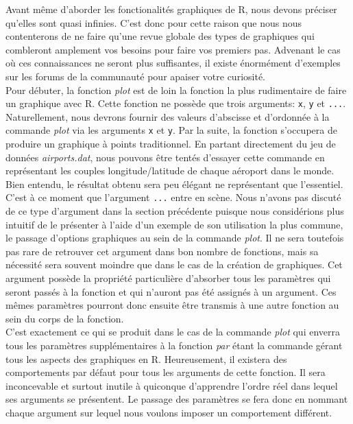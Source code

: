 Avant même d'aborder les fonctionalités graphiques de R, nous devons préciser qu'elles sont quasi infinies. C'est donc pour cette raison que nous nous contenterons de ne faire qu'une revue globale des types de graphiques qui combleront amplement vos besoins pour faire vos premiers pas. Advenant le cas où ces connaissances ne seront plus suffisantes, il existe énormément d'exemples sur les forums de la communauté pour apaiser votre curiosité. \\

\noindent
Pour débuter, la fonction \emph{plot} \cite{Rfunction:plot} est de loin la fonction la plus rudimentaire de faire un graphique avec R. Cette fonction ne possède que trois arguments: \texttt{x}, \texttt{y} et \texttt{...}. Naturellement, nous devrons fournir des valeurs d'abscisse et d'ordonnée à la commande \emph{plot} via les arguments \texttt{x} et \texttt{y}. Par la suite, la fonction s'occupera de produire un graphique à points traditionnel. En partant directement du jeu de données \emph{airports.dat}, nous pouvons être tentés d'essayer cette commande en représentant les couples longitude/latitude de chaque aéroport dans le monde. Bien entendu, le résultat obtenu sera peu élégant ne représentant que l'essentiel. \\

\noindent
C'est à ce moment que l'argument \texttt{...} entre en scène. Nous n'avons pas discuté de ce type d'argument dans la section précédente puisque nous considérions plus intuitif de le présenter à l'aide d'un exemple de son utilisation la plus commune, le passage d'options graphiques au sein de la commande \emph{plot}. Il ne sera toutefois pas rare de retrouver cet argument dans bon nombre de fonctions, mais sa nécessité sera souvent moindre que dans le cas de la création de graphiques. Cet argument possède la propriété particulière d'absorber tous les paramètres qui seront passés à la fonction et qui n'auront pas été assignés à un argument. Ces mêmes paramètres pourront donc ensuite être transmis à une autre fonction au sein du corps de la fonction. \\

\noindent
C'est exactement ce qui se produit dans le cas de la commande \emph{plot} qui enverra tous les paramètres supplémentaires à la fonction \emph{par} \cite{Rfunction:par} étant la commande gérant tous les aspects des graphiques en R. Heureusement, il existera des comportements par défaut pour tous les arguments de cette fonction. Il sera inconcevable et surtout inutile à quiconque d'apprendre l'ordre réel dans lequel ses arguments se présentent. Le passage des paramètres se fera donc en nommant chaque argument sur lequel nous voulons imposer un comportement différent. \\

